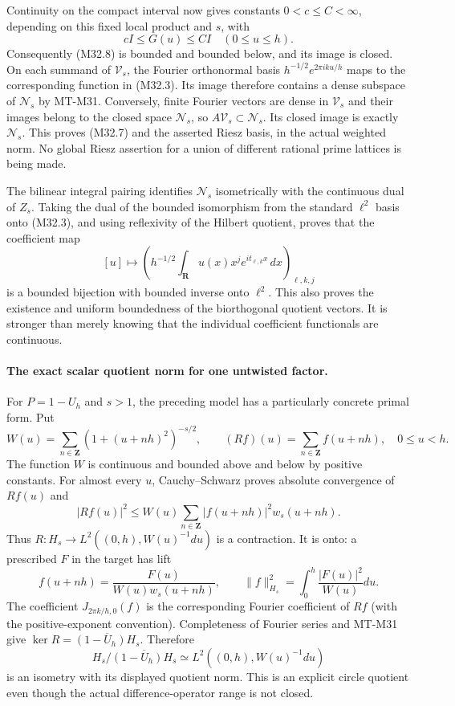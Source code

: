 Continuity on the compact interval now gives constants
$0<c\leq C<\infty$, depending on this fixed local product
and $s$, with
\[
                  cI\leq G(u)\leq CI\quad(0\leq u\leq h).
 \tag{M32.13}
\]
Consequently (M32.8) is bounded and bounded below, and
its image is closed.  On each summand of $\mathcal V_s$,
the Fourier orthonormal basis
$h^{-1/2}e^{2\pi iku/h}$ maps to the corresponding
function in (M32.3).  Its image therefore contains a dense
subspace of $\mathcal N_s$ by MT-M31.  Conversely, finite
Fourier vectors are dense in $\mathcal V_s$ and their
images belong to the closed space $\mathcal N_s$, so
$A\mathcal V_s\subset\mathcal N_s$.  Its closed
image is exactly $\mathcal N_s$.  This proves (M32.7)
and the asserted Riesz basis, in the actual weighted norm.
No global Riesz assertion for a union of different rational
prime lattices is being made.

The bilinear integral pairing identifies $\mathcal N_s$
isometrically with the continuous dual of $Z_s$.
Taking the dual of the bounded isomorphism from the
standard $\ell^2$ basis onto (M32.3), and using reflexivity
of the Hilbert quotient, proves that the coefficient map
\[
 [u]\longmapsto
 \left(h^{-1/2}\int_{\mathbf R}u(x)x^je^{it_{\ell,k}x}\,dx
                                      \right)_{\ell,k,j}
 \tag{M32.14}
\]
is a bounded bijection with bounded inverse onto $\ell^2$.
This also proves the existence and uniform boundedness
of the biorthogonal quotient vectors.  It is stronger
than merely knowing that the individual coefficient
functionals are continuous.

\paragraph{The exact scalar quotient norm for one untwisted factor.}
For $P=1-U_h$ and $s>1$, the preceding model has a
particularly concrete primal form.  Put
\[
 W(u)=\sum_{n\in\mathbf Z}(1+(u+nh)^2)^{-s/2},
 \qquad
 (Rf)(u)=\sum_{n\in\mathbf Z}f(u+nh),\quad 0\leq u<h.
 \tag{M32.14a}
\]
The function $W$ is continuous and bounded above and
below by positive constants.  For almost every $u$,
Cauchy--Schwarz proves absolute convergence of $Rf(u)$
and
\[
 |Rf(u)|^2\leq W(u)
         \sum_{n\in\mathbf Z}|f(u+nh)|^2w_s(u+nh).
\]
Thus $R:H_s\to L^2((0,h),W(u)^{-1}du)$ is a contraction.
It is onto: a prescribed $F$ in the target has lift
\[
 f(u+nh)=\frac{F(u)}{W(u)w_s(u+nh)},
 \qquad
 \|f\|_{H_s}^2=\int_0^h\frac{|F(u)|^2}{W(u)}du.
 \tag{M32.14b}
\]
The coefficient $J_{2\pi k/h,0}(f)$ is the corresponding
Fourier coefficient of $Rf$ (with the positive-exponent
convention).  Completeness of Fourier series and MT-M31
give $\ker R=\overline{(1-U_h)H_s}$.  Therefore
\[
 H_s/\overline{(1-U_h)H_s}
        \simeq L^2((0,h),W(u)^{-1}du)
 \tag{M32.14c}
\]
is an isometry with its displayed quotient norm.
This is an explicit circle quotient even though the
actual difference-operator range is not closed.

